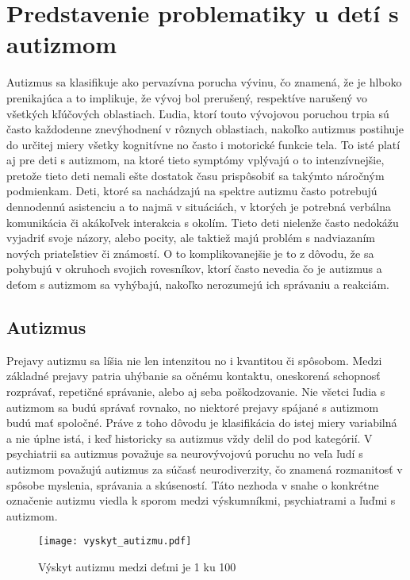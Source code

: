 \documentclass[10pt,twoside,slovak,a4paper]{coursepaper}
\begin{document}
\section{Predstavenie problematiky u detí s autizmom} 
	Autizmus sa klasifikuje ako pervazívna porucha vývinu, čo znamená, že je hlboko prenikajúca a to implikuje, že vývoj bol prerušený, respektíve narušený vo všetkých kľúčových oblastiach. Ľudia, ktorí touto vývojovou poruchou trpia sú často každodenne znevýhodnení v rôznych oblastiach, nakoľko autizmus postihuje do určitej miery všetky kognitívne no často i motorické funkcie tela. To isté platí aj pre deti s autizmom, na ktoré tieto symptómy vplývajú o to intenzívnejšie, pretože tieto deti nemali ešte dostatok času prispôsobiť sa takýmto náročným podmienkam. Deti, ktoré sa nachádzajú na spektre autizmu často potrebujú dennodennú asistenciu a to najmä v situáciách, v ktorých je potrebná verbálna komunikácia či akákoľvek interakcia s okolím. Tieto deti nielenže často nedokážu vyjadriť svoje názory, alebo pocity, ale taktiež majú problém s nadviazaním nových priateľstiev či známostí. O to komplikovanejšie je to z dôvodu, že sa pohybujú v okruhoch svojich rovesníkov, ktorí často nevedia čo je autizmus a deťom s autizmom sa vyhýbajú, nakoľko nerozumejú ich správaniu a reakciám.  



\subsection{Autizmus}
	Prejavy autizmu sa líšia nie len intenzitou no i kvantitou či spôsobom. Medzi základné prejavy patria uhýbanie sa očnému kontaktu, oneskorená schopnosť rozprávať, repetičné správanie, alebo aj seba poškodzovanie. Nie všetci ľudia s autizmom sa budú správať rovnako, no niektoré prejavy spájané s autizmom budú mať spoločné. Práve z toho dôvodu je klasifikácia do istej miery variabilná a nie úplne istá, i keď historicky sa autizmus vždy delil do pod kategórií. V psychiatrii sa autizmus považuje sa neurovývojovú poruchu no veľa ľudí s autizmom považujú autizmus za súčasť neurodiverzity, čo znamená rozmanitosť v spôsobe myslenia, správania a skúseností. Táto nezhoda v snahe o konkrétne označenie autizmu viedla k sporom medzi výskumníkmi, psychiatrami a ľuďmi s autizmom.    

\begin{figure*}[tbh]
\centering
\texttt{[image: vyskyt\_autizmu.pdf]}
\caption{Výskyt autizmu medzi deťmi je 1 ku 100}
\label{f:rozhod}
\end{figure*}
\end{document}
